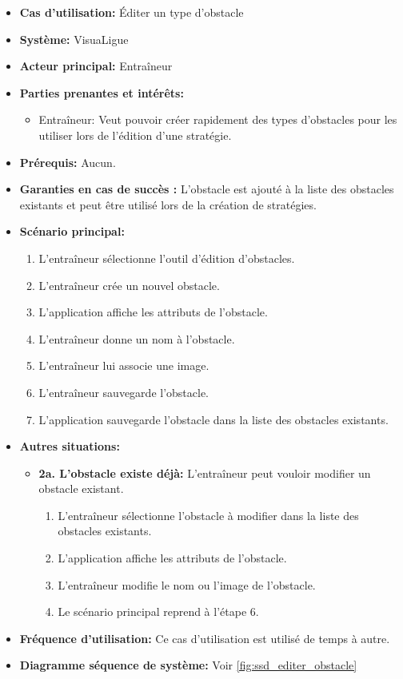 \begin{itemize}
    \item \textbf{Cas d'utilisation:} \'Editer un type d'obstacle
    \item \textbf{Syst\`eme:} VisuaLigue
    \item \textbf{Acteur principal:} Entra\^ineur
    \item \textbf{Parties prenantes et int\'er\^ets:}
        \begin{itemize}
            \item Entra\^ineur: Veut pouvoir cr\'eer rapidement des types d'obstacles pour les utiliser lors de l'\'edition d'une strat\'egie.
        \end{itemize}
    \item \textbf{Pr\'erequis:} Aucun.
    \item \textbf{Garanties en cas de succ\`es :} L'obstacle est ajout\'e \`a la liste des obstacles existants et peut \^etre utilis\'e lors de la cr\'eation de strat\'egies.
    \item \textbf{Sc\'enario principal:}
        \begin{enumerate}
            \item L'entraîneur sélectionne l'outil d'édition d'obstacles.
            \item L'entraîneur crée un nouvel obstacle.
            \item L'application affiche les attributs de l'obstacle.
            \item L'entra\^ineur donne un nom \`a l'obstacle.
            \item L'entra\^ineur lui associe une image.
            \item L'entra\^ineur sauvegarde l'obstacle.
            \item L'application sauvegarde l'obstacle dans la liste des obstacles existants.
        \end{enumerate}
    \item \textbf{Autres situations:}
        \begin{itemize}
            \item \textbf{2a. L'obstacle existe déjà: } L'entraîneur peut vouloir modifier un obstacle existant.
                \begin{enumerate}
                    \item L'entraîneur sélectionne l'obstacle à modifier dans la liste des obstacles existants.
                    \item L'application affiche les attributs de l'obstacle.
                    \item L'entraîneur modifie le nom ou l'image de l'obstacle.
                    \item Le scénario principal reprend à l'étape 6.
                \end{enumerate}
        \end{itemize}
    \item \textbf{Fréquence d'utilisation:} Ce cas d'utilisation est utilis\'e de temps \`a autre.
    \item \textbf{Diagramme s\'equence de syst\`eme:} Voir \ref{fig:ssd_editer_obstacle}
\end{itemize}
